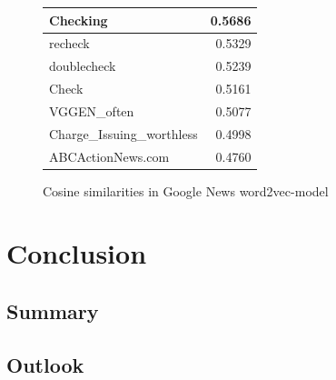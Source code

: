 \documentclass[article,type=msc,colorback,accentcolor=tud7b]{tudthesis}
\begin{document}
\begin{figure}[H]
\begin{floatrow}
{{\begin{tabular}{| l | r |}
		Checking & 0.5686 \\ \hline
		recheck & 0.5329 \\ \hline
		doublecheck & 0.5239 \\ \hline
		Check & 0.5161 \\ \hline
		VGGEN\_often & 0.5077 \\ \hline
		Charge\_Issuing\_worthless & 0.4998 \\ \hline
		ABCActionNews.com & 0.4760 \\ \hline
      \end{tabular}
      }
      \quad
      }{%
        \caption{Cosine similarities in Google News word2vec-model}
        \label{tab:cosine_similarities_w2v_pretrained}
      }
      \end{floatrow}
	\end{figure}

  \clearpage  
  
  \section{Conclusion}

  \subsection{Summary}
  
  \subsection{Outlook}
  \clearpage
  
  \printbibliography
  \clearpage
  
\end{document}
